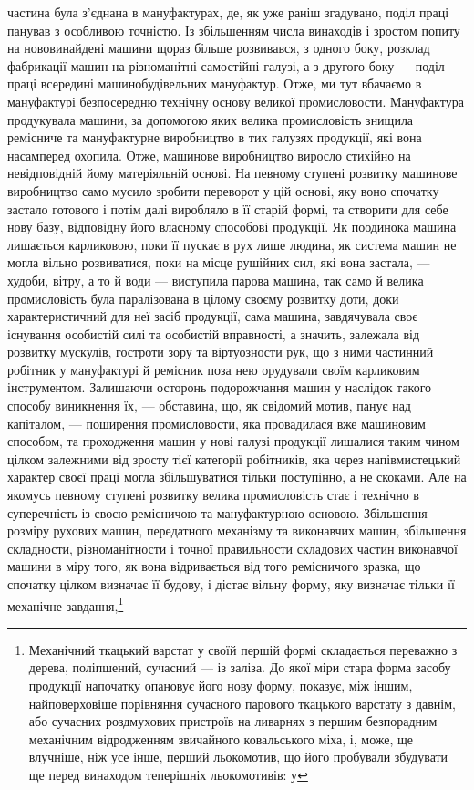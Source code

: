 \parcont{}  %
частина була з’єднана в мануфактурах, де, як уже раніш згадувано,
поділ праці панував з особливою точністю. Із збільшенням числа
винаходів і зростом попиту на нововинайдені машини щораз
більше розвивався, з одного боку, розклад фабрикації машин на
різноманітні самостійні галузі, а з другого боку — поділ праці
всередині машинобудівельних мануфактур. Отже, ми тут вбачаємо
в мануфактурі безпосередню технічну основу великої промисловости.
Мануфактура продукувала машини, за допомогою яких
велика промисловість знищила ремісниче та мануфактурне виробництво
в тих галузях продукції, які вона насамперед охопила.
Отже, машинове виробництво виросло стихійно на невідповідній
йому матеріяльній основі. На певному ступені розвитку машинове
виробництво само мусило зробити переворот у цій основі, яку воно
спочатку застало готового і потім далі виробляло в її старій формі,
та створити для себе нову базу, відповідну його власному способові
продукції. Як поодинока машина лишається карликовою, поки
її пускає в рух лише людина, як система машин не могла вільно
розвиватися, поки на місце рушійних сил, які вона застала, —
худоби, вітру, а то й води — виступила парова машина, так само
й велика промисловість була паралізована в цілому своєму розвитку
доти, доки характеристичний для неї засіб продукції,
сама машина, завдячувала своє існування особистій силі та особистій
вправності, а значить, залежала від розвитку мускулів,
гостроти зору та віртуозности рук, що з ними частинний робітник
у мануфактурі й ремісник поза нею орудували своїм карликовим
інструментом. Залишаючи осторонь подорожчання машин у
наслідок такого способу виникнення їх, — обставина, що, як свідомий
мотив, панує над капіталом, — поширення промисловости,
яка провадилася вже машиновим способом, та проходження машин
у нові галузі продукції лишалися таким чином цілком залежними
від зросту тієї категорії робітників, яка через напівмистецький
характер своєї праці могла збільшуватися тільки поступінно,
а не скоками. Але на якомусь певному ступені розвитку велика
промисловість стає і технічно в суперечність із своєю ремісничою
та мануфактурною основою. Збільшення розміру рухових
машин, передатного механізму та виконавчих машин, збільшення
складности, різноманітности і точної правильности складових
частин виконавчої машини в міру того, як вона відривається від
того ремісничого зразка, що спочатку цілком визначає її будову, і
дістає вільну форму, яку визначає тільки її механічне завдання,\footnote{
Механічний ткацький варстат у своїй першій формі складається
переважно з дерева, поліпшений, сучасний — із заліза. До якої міри стара
форма засобу продукції напочатку опановує його нову форму, показує,
між іншим, найповерховіше порівняння сучасного парового ткацького
варстату з давнім, або сучасних роздмухових пристроїв на ливарнях
з першим безпорадним механічним відродженням звичайного ковальського
міха, і, може, ще влучніше, ніж усе інше, перший льокомотив, що його
пробували збудувати ще перед винаходом теперішніх льокомотивів: у
}
